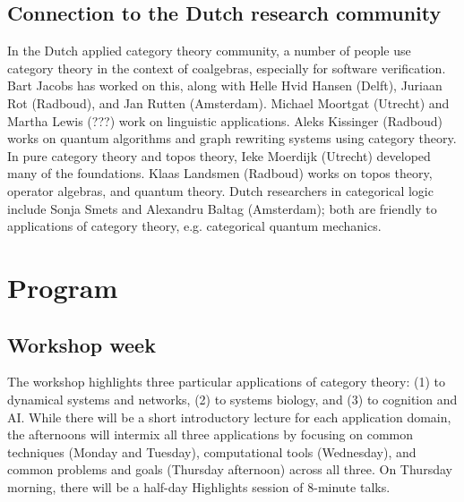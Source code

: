 \documentclass{article}
\newcommand{\redout}[1]{{\color{red}#1}}
\begin{document}
\subsection{Connection to the Dutch research community}
In the Dutch applied category theory community, a number of people use category theory  in the context of coalgebras, especially for software verification. Bart Jacobs has worked on this, along with Helle Hvid Hansen (Delft), Juriaan Rot (Radboud), and Jan Rutten (Amsterdam). Michael Moortgat (Utrecht) and \redout{Martha Lewis (???)} work on linguistic applications. Aleks Kissinger (Radboud) works on quantum algorithms and graph rewriting systems using category theory. In pure category theory and topos theory, Ieke Moerdijk (Utrecht) developed many of the foundations. Klaas Landsmen (Radboud) works on topos theory, operator algebras, and quantum theory. Dutch researchers in categorical logic include Sonja Smets and Alexandru Baltag (Amsterdam); both are friendly to applications of category theory, e.g. categorical quantum mechanics.

\section{Program}
\subsection{Workshop week}
The workshop highlights three particular applications of category theory: (1) to dynamical systems and networks, (2) to systems biology, and (3) to cognition and AI. While there will be a short introductory lecture for each application domain, the afternoons will intermix all three applications by focusing on common techniques (Monday and Tuesday), computational tools (Wednesday), and common problems and goals (Thursday afternoon) across all three. On Thursday morning, there will be a half-day Highlights session of 8-minute talks.
\end{document}
